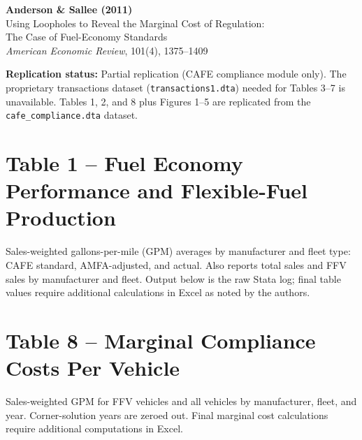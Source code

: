 \documentclass[12pt]{article}
\begin{document}
\begin{center}
{\Large\bfseries Anderson \& Sallee (2011)}\\
{\large Using Loopholes to Reveal the Marginal Cost of Regulation:}\\
{\large The Case of Fuel-Economy Standards}\\
\vspace{0.5em}
{\normalsize \textit{American Economic Review}, 101(4), 1375--1409}
\end{center}

\vspace{1em}
\noindent\textbf{Replication status:} Partial replication (CAFE compliance module only).
The proprietary transactions dataset (\texttt{transactions1.dta}) needed for
Tables 3--7 is unavailable. Tables 1, 2, and 8 plus Figures 1--5 are replicated
from the \texttt{cafe\_compliance.dta} dataset.

\tableofcontents

\clearpage
\section{Table 1 -- Fuel Economy Performance and Flexible-Fuel Production}

Sales-weighted gallons-per-mile (GPM) averages by manufacturer and fleet type:
CAFE standard, AMFA-adjusted, and actual. Also reports total sales and FFV sales
by manufacturer and fleet. Output below is the raw Stata log; final table values
require additional calculations in Excel as noted by the authors.

\begin{scriptsize}

\end{scriptsize}

\clearpage
\section{Table 8 -- Marginal Compliance Costs Per Vehicle}

Sales-weighted GPM for FFV vehicles and all vehicles by manufacturer, fleet, and year.
Corner-solution years are zeroed out. Final marginal cost calculations require
additional computations in Excel.

\begin{scriptsize}

\end{scriptsize}
\end{document}
